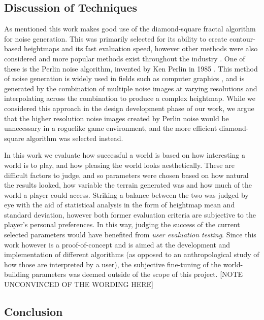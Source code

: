 \documentclass[12pt,a4paper]{article}
\begin{document}
\subsection{Discussion of Techniques}

As mentioned this work makes good use of the diamond-square fractal algorithm for noise generation. This was primarily selected for its ability to create contour-based heightmaps and its fast evaluation speed, however other methods were also considered and more popular methods exist throughout the industry \cite{pgcbook}. One of these is the Perlin noise algorithm, invented by Ken Perlin in 1985 \cite{imagesynth}. This method of noise generation is widely used in fields such as computer graphics \cite{textmodel}, and is generated by the combination of multiple noise images at varying resolutions and interpolating across the combination to produce a complex heightmap. While we considered this approach in the design development phase of our work, we argue that the higher resolution noise images created by Perlin noise would be unnecessary in a roguelike game environment, and the more efficient \cite{surveyPNF} diamond-square algorithm was selected instead. 

In this work we evaluate how successful a world is based on how interesting a world is to play, and how pleasing the world looks aesthetically. These are difficult factors to judge, and so parameters were chosen based on how natural the results looked, how variable the terrain generated was and how much of the world a player could access. Striking a balance between the two was judged by eye with the aid of statistical analysis in the form of heightmap mean and standard deviation, however both former evaluation criteria are subjective to the player's personal preferences. In this way, judging the success of the current selected parameters would have benefited from \emph{user evaluation testing}. Since this work however is a proof-of-concept and is aimed at the development and implementation of different algorithms (as opposed to an anthropological study of how those are interpreted by a user), the subjective fine-tuning of the world-building parameters was deemed outside of the scope of this project. [NOTE UNCONVINCED OF THE WORDING HERE]


\subsection{Conclusion}
\end{document}
